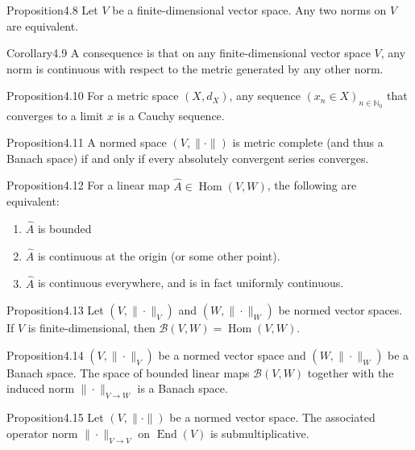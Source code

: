 \begin{res}{Proposition}{4.8}
Let $V$ be a finite-dimensional vector space. Any two norms on $V$ are equivalent.
\end{res}

\begin{res}{Corollary}{4.9}
A consequence is that on any finite-dimensional vector space $V$, any norm is continuous with respect to the metric generated by any other norm.
\end{res}

\begin{res}{Proposition}{4.10}
For a metric space $(X,d_X)$, any sequence $(x_n\in X)_{n\in\mathbb N_0}$ that converges to a limit $x$ is a Cauchy sequence.
\end{res}

\begin{res}{Proposition}{4.11}
A normed space $(V,\|\cdot\|)$ is metric complete (and thus a Banach space) if and only if every absolutely convergent series converges.
\end{res}

\begin{res}{Proposition}{4.12}
For a linear map $\hat A\in\operatorname{Hom}(V,W)$, the following are equivalent:
\begin{enumerate}
\item $\hat A$ is bounded
\item $\hat A$ is continuous at the origin (or some other point).
\item $\hat A$ is continuous everywhere, and is in fact uniformly continuous.
\end{enumerate}
\end{res}

\begin{res}{Proposition}{4.13}
Let $(V,\|\cdot\|_V)$ and $(W,\|\cdot\|_W)$ be normed vector spaces. If $V$ is finite-dimensional, then $\mathcal B(V,W)=\operatorname{Hom}(V,W)$.
\end{res}

\begin{res}{Proposition}{4.14}
$(V,\|\cdot\|_V)$ be a normed vector space and $(W,\|\cdot\|_W)$ be a Banach space. The space of bounded linear maps $\mathcal B(V,W)$ together with the induced norm $\|\cdot\|_{V\to W}$ is a Banach space.
\end{res}

\begin{res}{Proposition}{4.15}
Let $(V,\|\cdot\|)$ be a normed vector space. The associated operator norm $\|\cdot\|_{V\to V}$ on $\operatorname{End}(V)$ is submultiplicative.
\end{res}

